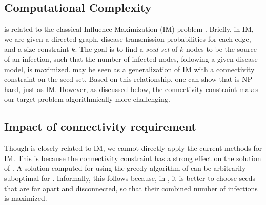 

\subsection{Computational Complexity}
\maxcrit{} is related to the classical Influence Maximization (IM) problem \cite{kempe:sigkdd03}. Briefly, in IM, we are given a directed graph, disease transmission probabilities for each edge, and a size constraint $k$. The goal is to find a \emph{seed set} of $k$ nodes to be the source of an infection, such that the number of infected nodes, following a given disease model, is maximized. \maxcrit{} may be seen as a generalization of IM with a connectivity constraint on the seed set. %
Based on this relationship, one can show that \maxcrit{} is NP-hard, just as IM. However, as discussed below, the connectivity constraint makes our target problem algorithmically more challenging.


\subsection{Impact of connectivity requirement}
Though \maxcrit{} is closely related to IM, we cannot directly apply the current methods for IM. This is because the connectivity constraint has a strong effect on the solution of \maxcrit{}. A solution computed for \infmax{} using the greedy algorithm of \cite{kempe:sigkdd03} can be arbitrarily suboptimal for \maxcrit{}. Informally, this follows because, in \infmax{}, it is better to choose seeds that are far apart and disconnected, so that their combined number of infections is maximized.

